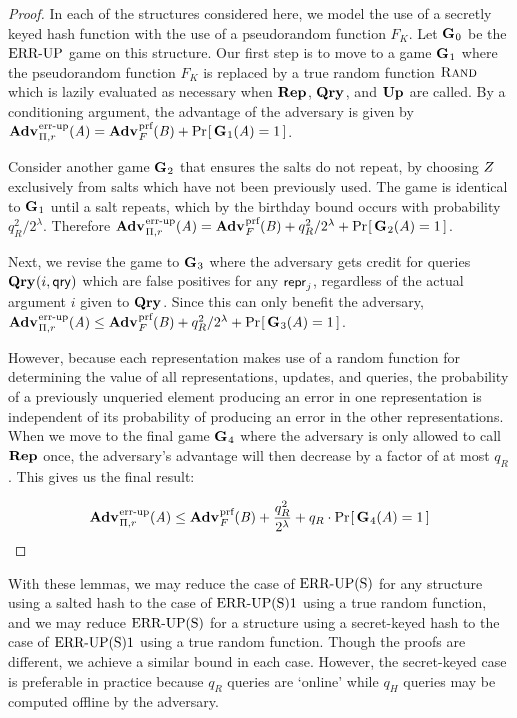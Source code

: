 \begin{proof}
In each of the structures considered here, we model the use of a secretly keyed hash function with the use of a pseudorandom function $F_K$. Let $\mathbf{G}\hspace{0.5pt}_0$ be the $\textnormal{ERR\mbox{-}UP}$ game on this structure. Our first step is to move to a game $\mathbf{G}\hspace{0.5pt}_1$ where the pseudorandom function $F_K$ is replaced by a true random function $\textsc{Rand}$ which is lazily evaluated as necessary when $\mathbf{Rep}\hspace{0.5pt}$, $\mathbf{Qry}\hspace{0.5pt}$, and $\mathbf{Up}\hspace{0.5pt}$ are called. By a conditioning argument, the advantage of the adversary is given by $\Adv{\errep}_{\struct,r}(\advA) = \Adv{\prf}_F(\advB) + \Prob{\G_1(\advA)=1}$.

Consider another game $\mathbf{G}\hspace{0.5pt}_2$ that ensures the salts do not repeat, by choosing $Z$ exclusively from salts which have not been previously used. The game is identical to $\mathbf{G}\hspace{0.5pt}_1$ until a salt repeats, which by the birthday bound occurs with probability $q_R^2/2^\lambda$. Therefore $\Adv{\errep}_{\struct,r}(\advA) = \Adv{\prf}_F(\advB) + q_R^2/2^\lambda + \Prob{\G_2(A) = 1}$.

Next, we revise the game to $\mathbf{G}\hspace{0.5pt}_3$ where the adversary gets credit for queries $\mathbf{Qry}\hspace{0.5pt}(i,\mathsf{qry})$ which are false positives for any $\mathsf{repr}_j$, regardless of the actual argument $i$ given to $\mathbf{Qry}\hspace{0.5pt}$. Since this can only benefit the adversary, $\Adv{\errep}_{\struct,r}(\advA) \le \Adv{\prf}_F(\advB) + q_R^2/2^\lambda + \Prob{\G_3(A) = 1}$.

However, because each representation makes use of a random function for determining the value of all representations, updates, and queries, the probability of a previously unqueried element producing an error in one representation is independent of its probability of producing an error in the other representations. When we move to the final game $\mathbf{G}\hspace{0.5pt}_4$ where the adversary is only allowed to call $\mathbf{Rep}\hspace{0.5pt}$ once, the adversary's advantage will then decrease by a factor of at most $q_R$. This gives us the final result:

$$\Adv{\errep}_{\struct,r}(\advA) \le \Adv{\prf}_F(\advB) + \frac{q_R^2}{2^\lambda} + q_R \cdot \Prob{\G_4(A) = 1}$$\missingqed
\end{proof}

With these lemmas, we may reduce the case of $\textnormal{ERR\mbox{-}UP(S)}$ for any structure using a salted hash to the case of $\textnormal{ERR\mbox{-}UP(S)}1$ using a true random function, and we may reduce $\textnormal{ERR\mbox{-}UP(S)}$ for a structure using a secret-keyed hash to the case of $\textnormal{ERR\mbox{-}UP(S)}1$ using a true random function. Though the proofs are different, we achieve a similar bound in each case. However, the secret-keyed case is preferable in practice because $q_R$ queries are `online' while $q_H$ queries may be computed offline by the adversary.

